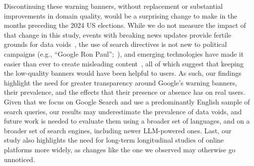 Discontinuing these warning banners, without replacement or substantial improvements in domain quality, would be a surprising change to make in the months preceding the 2024 US elections.
While we do not measure the impact of that change in this study, events with breaking news updates provide fertile grounds for data voids~\citep{golebiewski2019data}, the use of search directives is not new to political campaigns (e.g., ``Google Ron Paul'';~\cite{baker2008google}), and emerging technologies have made it easier than ever to create misleading content~\citep{feuerriegel2023research}, all of which suggest that keeping the low-quality banners would have been helpful to users.
As such, our findings highlight the need for greater transparency around Google's warning banners, their prevalence, and the effects that their presence or absence has on real users.
Given that we focus on Google Search and use a predominantly English sample of search queries, our results may underestimate the prevalence of data voids, and future work is needed to evaluate them using a broader set of languages, and on a broader set of search engines, including newer LLM-powered ones.
Last, our study also highlights the need for long-term longitudinal studies of online platforms more widely, as changes like the one we observed may otherwise go unnoticed.

